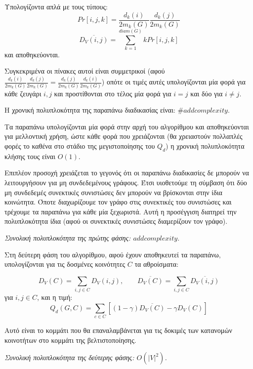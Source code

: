 \documentclass[12pt, letterpaper]{article}
\begin{document}
\begin{itemize}
    Υπολογίζοντα απλά με τους τύπους:
    \[ Pr[i,j,k] = \frac{d_k(i)}{2m_k(G)} \frac{d_k(j)}{2m_k(G)} \]
    \[ \overline{D_V(i,j)} = \sum_{k=1}^{diam(G)} k Pr[i,j,k] \]
    και αποθηκεύονται. 
    
    Συγκεκριμένα οι πίνακες αυτοί είναι συμμετρικοί (αφού 
    $\frac{d_k(i)}{2m_k(G)} \frac{d_k(j)}{2m_k(G)} = \frac{d_k(j)}{2m_k(G)} \frac{d_k(i)}{2m_k(G)}$)
    οπότε οι τιμές αυτές υπολογίζονται μία φορά για κάθε ζευγάρι $i,j$ και προστίθονται
    στο τέλος μία φορά για $i=j$ και δύο για $i \neq j$.
    
    Η χρονική πολυπλοκότητα της παραπάνω διαδικασίας είναι:
    $\#add complexity$.

    

\end{itemize}

Τα παραπάνω υπολογίζονται μία φορά στην αρχή του αλγορίθμου και αποθηκεύονται 
για μελλοντική χρήση, ώστε κάθε φορά που χρειάζονται (θα χρειαστούν πολλαπλές φορές 
το καθένα στο στάδιο της μεγιστοποίησης του $Q_d$) η χρονική πολυπλοκότητα κλήσης τους είναι $O(1)$.

Επιπλέον προσοχή χρειάζεται το γεγονός ότι οι παραπάνω διαδικασίες δε μπορούν 
να λειτουργήσουν για μη συνδεδεμένους γράφους. Έτσι υιοθετούμε τη σύμβαση ότι 
δύο μη συνδεδεμές συνεκτικές συνιστώσες δεν μπορούν να βρίσκονται στην ίδια 
κοινώτητα. Όποτε διαχωρίζουμε τον γράφο στις συνεκτικές του συνιστώσες και 
τρέχουμε τα παραπάνω για κάθε μία ξεχωριστά. Αυτή η προσέγγιση διατηρεί την 
πολυπλοκότητα ίδια (αφού οι συνεκτικές συνιστώσες διαμερίζουν τον γράφο).

\bigskip

\emph{Συνολική πολυπλοκότητα της πρώτης φάσης: $add complexity$.}

\bigskip

Στη δεύτερη φάση του αλγορίθμου, αφού έχουν αποθηκευτεί τα παραπάνω, 
υπολογίζονται για τις δοσμένες κοινότητες $C$ τα αθροίσματα: 


\[ D_V(C) = \sum_{i,j \in C} D_V(i,j), \qquad \overline{ D_V(C)  } =  \sum_{i,j \in C} \overline{ D_V(i,j) }\]
 για $i,j \in C$, και η τιμή:
\[ Q_d(G,C) = \sum_{c \in C} [(1 - \gamma)\overline{ D_V(C) } - \gamma D_V(C) ]\]

Αυτό είναι το κομμάτι που θα επαναλαμβάνεται για τις δοκιμές των κατανομών
κοινοτήτων στο κομμάτι της βελτιστοποίησης.
\bigskip

\emph{Συνολική πολυπλοκότητα της δεύτερης φάσης: $O(|V|^2)$.}

\bigskip
\end{document}

